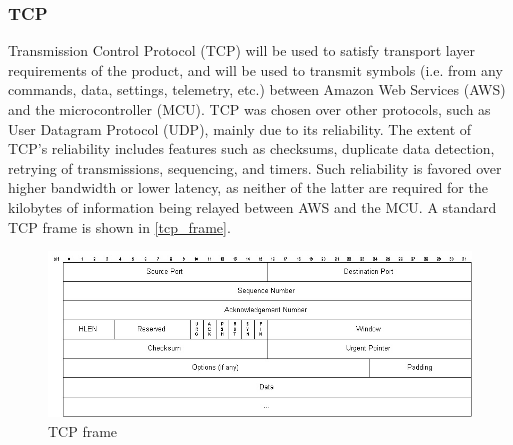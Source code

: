 \subsubsection{TCP} \label{tcp_standard} Transmission Control Protocol (TCP) will be used to satisfy transport layer
requirements of the product, and will be used to transmit symbols (i.e.
from any commands, data, settings, telemetry, etc.) between Amazon Web
Services (AWS) and the microcontroller (MCU). TCP was chosen over other
protocols, such as User Datagram Protocol (UDP), mainly due to its
reliability. The extent of TCP's reliability includes features such as
checksums, duplicate data detection, retrying of transmissions, sequencing,
and timers.
Such reliability is favored over higher bandwidth or lower
latency, as neither of the latter are required for the kilobytes
of information being relayed between AWS and the MCU. A standard TCP frame
is shown in \autoref{tcp_frame}.
\begin{figure}[H]
    \caption{TCP frame \cite{Kristoff}}
    \label{tcp_frame}
    \centering
    \includegraphics[width=\textwidth]{images/tcp_frame.jpg}
\end{figure}


